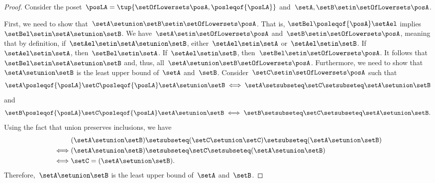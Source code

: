 \begin{proof}
    Consider the poset~$\posLA=\tup{\setOfLowersets \posA, \posleqof{\posLA}}$ and~$\setA,\setB\setin \setOfLowersets \posA$.

    First, we need to show that~$\setA\setunion \setB\setin \setOfLowersets \posA$. That is, $\setBel \posleqof{\posA} \setAel$ implies $\setBel \setin \setA\setunion \setB$.
    We have~$\setA \setin \setOfLowersets \posA$ and~$\setB\setin \setOfLowersets \posA$, meaning that by definition, if~$\setAel\setin \setA\setunion \setB$, either~$\setAel\setin \setA$ or~$\setAel\setin \setB$.
    If~$\setAel\setin \setA$, then~$\setBel\setin \setA$.
    If~$\setAel\setin \setB$, then~$\setBel\setin \setOfLowersets \posA$.
    It follows that~$\setBel\setin \setA\setunion \setB$ and, thus,  all~$\setA\setunion \setB\setOfLowersets \posA$.
    Furthermore, we need to show that~$\setA\setunion \setB$ is the least upper bound of~$\setA$ and~$\setB$.
    Consider~$\setC\setin \setOfLowersets \posA$ such that
\[
    \setA\posleqof{\posLA} \setC\posleqof{\posLA} \setA\setunion \setB
\iff
    \setA\setsubseteq \setC\setsubseteq \setA\setunion \setB
\]
and
\[
    \setB\posleqof{\posLA} \setC\posleqof{\posLA} \setA\setunion \setB
\iff
    \setB\setsubseteq \setC\setsubseteq \setA\setunion \setB.
\]
    Using the fact that union preserves inclusions, we have
    \begin{equation*}
        \begin{aligned}
            &(\setA\setunion \setB)
                                    \setsubseteq (\setC \setunion \setC) \setsubseteq (\setA \setunion \setB) \\
            \iff & (\setA\setunion \setB) \setsubseteq \setC \setsubseteq (\setA\setunion \setB) \\
            \iff & \setC                   = (\setA\setunion \setB).
        \end{aligned}
    \end{equation*}
    Therefore,~$\setA\setunion \setB$ is the least upper bound of~$\setA$ and~$\setB$.


\end{proof}
